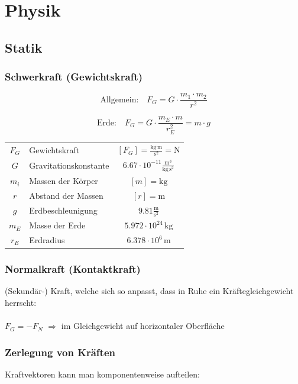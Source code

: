 
\section{Physik}

	\subsection{Statik}
		
	\subsubsection{Schwerkraft (Gewichtskraft)}
	
	$$ \boxed{ \text{Allgemein:} \quad F_G = G \cdot \frac{m_1 \cdot m_2}{r^2} }$$
	
	$$ \boxed{ \text{Erde:} \quad  F_G = G \cdot \frac{m_E \cdot m}{r_E^2} = m \cdot g }$$ 

		
	\begin{tabular}{c l c}
	$F_G$ & Gewichtskraft & $[F_G] = \mathrm{\frac{kg \, m}{s^2} = N}$ \\
	$G$ & Gravitationskonstante & $6.67 \cdot 10^{-11} \mathrm{\frac{m^3}{kg \, s^2}}$ \\ 
	$m_i$ & Massen der Körper & $[m] = \mathrm{kg}$ \\
	$r$ & Abstand der Massen & $[r] =\mathrm{m}$ \\
	$g$ & Erdbeschleunigung & $9.81 \mathrm{\frac{m}{s^2}}$ \\
	$m_E$ & Masse der Erde & $5.972 \cdot 10^{24} \, \mathrm{kg} $ \\
	$r_E$ & Erdradius & $6.378 \cdot 10^6 \, \mathrm{m}$ \\
	\end{tabular}
		
	\subsubsection{Normalkraft (Kontaktkraft)}
	(Sekundär-) Kraft, welche sich so anpasst, dass in Ruhe ein Kräftegleichgewicht herrscht: \\
	\\
	$\boxed{ F_G = -F_N}$ \qquad $\Rightarrow$ im Gleichgewicht auf horizontaler Oberfläche
		
		
	\subsubsection{Zerlegung von Kräften}
	Kraftvektoren kann man komponentenweise aufteilen: \\
	\\
	

